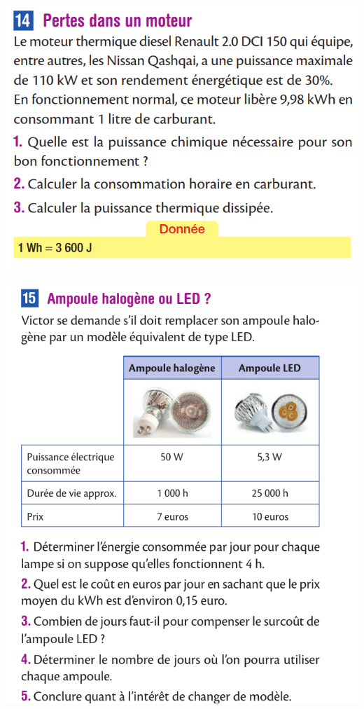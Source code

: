 \documentclass[10pt]{article}
\newcommand{\scalingby}{0.36}
\begin{document}
\begin{minipage}[c]{0.45\textwidth}
	\includegraphics[scale=\scalingby]{14.png}
\end{minipage}
\begin{minipage}[c]{0.45\textwidth}
	\includegraphics[scale=0.35]{15.png}
\end{minipage}
\end{document}
